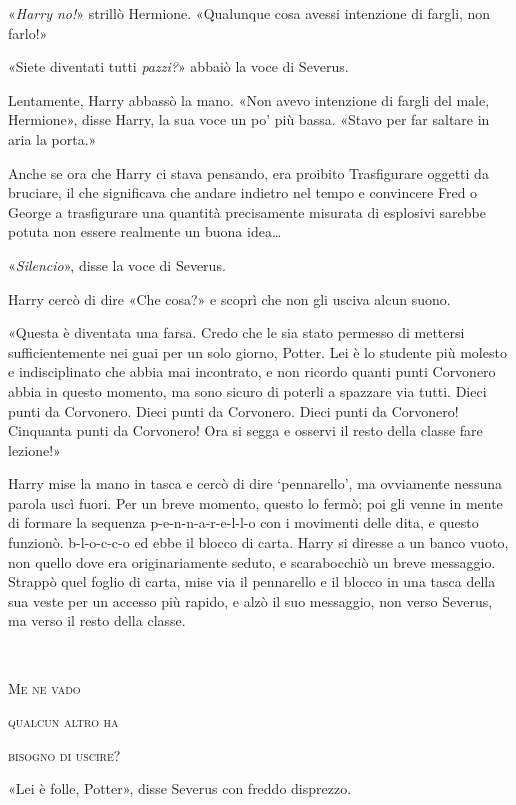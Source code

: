 «\textit{Harry no!}» strillò Hermione. «Qualunque cosa avessi intenzione di fargli, non farlo!»

«Siete diventati tutti \textit{pazzi?}» abbaiò la voce di Severus.

Lentamente, Harry abbassò la mano. «Non avevo intenzione di fargli del male, Hermione», disse Harry, la sua voce un po’ più bassa. «Stavo per far saltare in aria la porta.»

Anche se ora che Harry ci stava pensando, era proibito Trasfigurare oggetti da bruciare, il che significava che andare indietro nel tempo e convincere Fred o George a trasfigurare una quantità precisamente misurata di esplosivi sarebbe potuta non essere realmente un buona idea…

«\textit{Silencio}», disse la voce di Severus.

Harry cercò di dire «Che cosa?» e scoprì che non gli usciva alcun suono.

«Questa è diventata una farsa. Credo che le sia stato permesso di mettersi sufficientemente nei guai per un solo giorno, Potter. Lei è lo studente più molesto e indisciplinato che abbia mai incontrato, e non ricordo quanti punti Corvonero abbia in questo momento, ma sono sicuro di poterli a spazzare via tutti. Dieci punti da Corvonero. Dieci punti da Corvonero. Dieci punti da Corvonero! Cinquanta punti da Corvonero! Ora si segga e osservi il resto della classe fare lezione!»

Harry mise la mano in tasca e cercò di dire ‘pennarello’, ma ovviamente nessuna parola uscì fuori. Per un breve momento, questo lo fermò; poi gli venne in mente di formare la sequenza p-e-n-n-a-r-e-l-l-o con i movimenti delle dita, e questo funzionò. b-l-o-c-c-o ed ebbe il blocco di carta. Harry si diresse a un banco vuoto, non quello dove era originariamente seduto, e scarabocchiò un breve messaggio. Strappò quel foglio di carta, mise via il pennarello e il blocco in una tasca della sua veste per un accesso più rapido, e alzò il suo messaggio, non verso Severus, ma verso il resto della classe.

\begin{addmargin}[3em]{3em}%
~

\textsc{Me ne vado}

\textsc{qualcun altro ha}

\textsc{bisogno di uscire?}\\
\end{addmargin}

«Lei è folle, Potter», disse Severus con freddo disprezzo.

